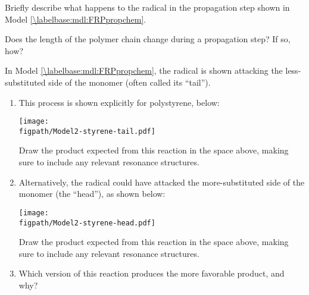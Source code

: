 \begin{activity}
\begin{ctqs}
	\question Briefly describe what happens to the radical in the propagation step shown in Model \ref{\labelbase:mdl:FRPpropchem}.%
	
		\begin{solution}[1.5in]
		\end{solution}
	
	\question Does the length of the polymer chain change during a propagation step?  If so, how?
	
		\begin{solution}[1.25in]
		\end{solution}
	
	\question In Model \ref{\labelbase:mdl:FRPpropchem}, the radical is shown attacking the less-substituted side of the monomer (often called its ``tail'').  
	
		\begin{enumerate}
			\item This process is shown explicitly for polystyrene, below:
	
			\vspace{6pt}
			\texttt{[image: \\figpath/Model2-styrene-tail.pdf]}
			\vspace{6pt}
			
				Draw the product expected from this reaction in the space above, making sure to include any relevant resonance structures.
				
				\vspace{12pt}
			\item Alternatively, the radical could have attacked the more-substituted side of the monomer (the ``head''), as shown below:
			
			\vspace{6pt}
			\texttt{[image: \\figpath/Model2-styrene-head.pdf]}
			\vspace{6pt}
			
				Draw the product expected from this reaction in the space above, making sure to include any relevant resonance structures.
				
				\vspace{12pt}
			\item Which version of this reaction produces the more favorable product, and why?
				
				\begin{solution}[1.5in]
				\end{solution}
			

\end{enumerate}
\end{ctqs}
\end{activity}
